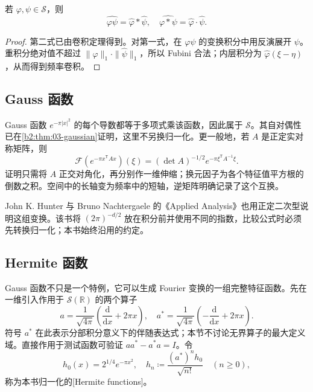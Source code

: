 \begin{proposition}\label{b2:prop:05-product-transform}
若 \(\varphi,\psi\in\mathcal S\)，则
\[
 \widehat{\varphi\psi}=\widehat\varphi*\widehat\psi,
 \quad \widehat{\varphi*\psi}=\widehat\varphi\cdot\widehat\psi.
\]
\end{proposition}
\begin{proof}
第二式已由卷积定理得到。对第一式，在 \(\varphi\psi\) 的变换积分中用反演展开 \(\psi\)。重积分绝对值不超过 \(\|\varphi\|_1\cdot\|\widehat\psi\|_1\)，所以 Fubini 合法；内层积分为 \(\widehat\varphi(\xi-\eta)\)，从而得到频率卷积。
\end{proof}

\subsection{Gauss 函数}
\label{b2:subsec:050203}

Gauss 函数 \(e^{-\pi|x|^2}\) 的每个导数都等于多项式乘该函数，因此属于 \(\mathcal S\)。其自对偶性已在\cref{b2:thm:03-gaussian}证明，这里不另换归一化。更一般地，若 \(A\) 是正定实对称矩阵，则
\[
 \mathcal F(e^{-\pi x^{\mathsf T}Ax})(\xi)
 =(\det A)^{-1/2}e^{-\pi\xi^{\mathsf T}A^{-1}\xi}.
\]
证明只需将 \(A\) 正交对角化，再分别作一维伸缩；换元因子为各个特征值平方根的倒数之积。空间中的长轴变为频率中的短轴，逆矩阵明确记录了这个互换。

\ProseParagraphBreak

John K. Hunter 与 Bruno Nachtergaele 的《Applied Analysis》\cite[pp. 303--304]{Hunter2001Applied}也用正定二次型说明这组变换。该书将 \((2\pi)^{-d/2}\) 放在积分前并使用不同的指数，比较公式时必须先转换归一化；本书始终沿用的约定。

\subsection{Hermite 函数}
\label{b2:subsec:050204}

Gauss 函数不只是一个特例，它可以生成 Fourier 变换的一组完整特征函数。先在一维引入作用于 \(\mathcal S(\mathbb R)\) 的两个算子
\[
 a=\dfrac1{\sqrt{4\pi}}\left(\dfrac{\mathrm{d}}{\mathrm{d}x}+2\pi x\right),
 \quad
 a^*=\dfrac1{\sqrt{4\pi}}\left(-\dfrac{\mathrm{d}}{\mathrm{d}x}+2\pi x\right).
\]
符号 \(a^*\) 在此表示分部积分意义下的伴随表达式；本节不讨论无界算子的最大定义域。直接作用于测试函数可验证 \(aa^*-a^*a=I\)。令
\[
 h_0(x)=2^{1/4}e^{-\pi x^2},\quad
 h_n\coloneqq\dfrac{(a^*)^nh_0}{\sqrt{n!}}\quad(n\geq0),
\]
称为本书归一化的[Hermite functions]。

